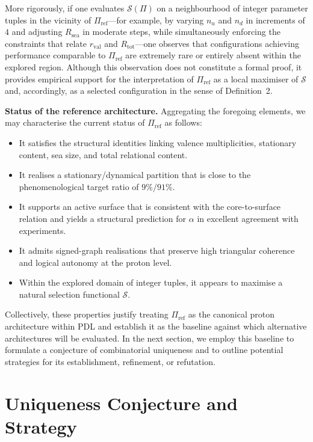 \documentclass[11pt,a4paper]{article}
\begin{document}
More rigorously, if one evaluates $\mathcal{S}(\Pi)$ on a neighbourhood of integer parameter tuples in the vicinity of $\Pi_{\mathrm{ref}}$—for example, by varying $n_u$ and $n_d$ in increments of $4$ and adjusting $R_{\mathrm{sea}}$ in moderate steps, while simultaneously enforcing the constraints that relate $r_{\mathrm{val}}$ and $R_{\mathrm{tot}}$—one observes that configurations achieving performance comparable to $\Pi_{\mathrm{ref}}$ are extremely rare or entirely absent within the explored region.\cite{LaubscherPDLFull2026,LaubscherIMRadPDL2026} Although this observation does not constitute a formal proof, it provides empirical support for the interpretation of $\Pi_{\mathrm{ref}}$ as a local maximiser of $\mathcal{S}$ and, accordingly, as a selected configuration in the sense of Definition~2.

\medskip
\noindent\textbf{Status of the reference architecture.} Aggregating the foregoing elements, we may characterise the current status of $\Pi_{\mathrm{ref}}$ as follows:
\begin{itemize}
\item It satisfies the structural identities linking valence multiplicities, stationary content, sea size, and total relational content.
\item It realises a stationary/dynamical partition that is close to the phenomenological target ratio of $9\%/91\%$.
\item It supports an active surface that is consistent with the core-to-surface relation and yields a structural prediction for $\alpha$ in excellent agreement with experiments.
\item It admits signed-graph realisations that preserve high triangular coherence and logical autonomy at the proton level.
\item Within the explored domain of integer tuples, it appears to maximise a natural selection functional $\mathcal{S}$.
\end{itemize}
Collectively, these properties justify treating $\Pi_{\mathrm{ref}}$ as the canonical proton architecture within PDL and establish it as the baseline against which alternative architectures will be evaluated. In the next section, we employ this baseline to formulate a conjecture of combinatorial uniqueness and to outline potential strategies for its establishment, refinement, or refutation.

\section{Uniqueness Conjecture and Strategy}
\label{sec:conjecture}
\end{document}
